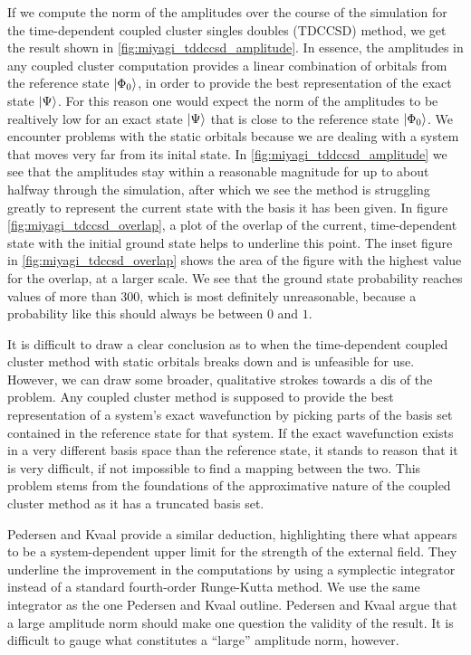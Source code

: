 If we compute the norm of the amplitudes over the course of the simulation for 
the time-dependent coupled cluster singles doubles (TDCCSD) method, we get the 
result shown in \autoref{fig:miyagi_tddccsd_amplitude}. In essence, the amplitudes 
in any coupled cluster computation provides a linear combination of orbitals 
from the reference state $\ket{\Phi_0}$, in order to provide the best representation of the 
exact state $\ket{\Psi}$. For this reason one would expect the norm of the 
amplitudes to be realtively low for an exact state $\ket{\Psi}$ that is close to the
reference state $\ket{\Phi_0}$.
We encounter problems with the static orbitals because we are dealing with a system that
moves very far 
from its inital state. In \autoref{fig:miyagi_tddccsd_amplitude} we see
that the amplitudes stay within a reasonable magnitude for up to about halfway through 
the simulation, after which we see the method is struggling greatly to 
represent the current state with the basis it has been given. In figure 
\autoref{fig:miyagi_tdccsd_overlap}, a plot of the 
overlap of the current, time-dependent state with the initial ground state
helps to underline this point. The inset figure in \autoref{fig:miyagi_tdccsd_overlap}
shows the area of the figure with the highest value for the overlap, at a larger scale.
We see that the ground state probability reaches values of more than $300$, which is 
most definitely unreasonable, because a probability like this should always be between 
$0$ and $1$.

It is difficult to draw a clear conclusion as to when the time-dependent coupled cluster 
method with static orbitals breaks down and is unfeasible for use. However, we can 
draw some broader, qualitative strokes towards a dis of the problem. Any coupled 
cluster method is supposed to provide the best representation of a system's exact 
wavefunction by picking parts of the basis set contained in the reference 
state for that system. If the exact wavefunction exists in a very different basis 
space than the reference state, it stands to reason that it is very difficult, if 
not impossible to find a mapping between the two. This problem stems from the foundations 
of the approximative nature of the coupled cluster method as it has a truncated basis set. 

Pedersen and Kvaal \cite{pedersen2019symplectic} provide a similar 
deduction, highlighting there what appears to be a system-dependent upper limit for 
the strength of the external field. They underline the improvement in the computations 
by using a symplectic integrator instead of a standard fourth-order Runge-Kutta method.
We use the same integrator as the one Pedersen and Kvaal outline.
Pedersen and Kvaal argue that a large amplitude norm should make one 
question the validity of the result. It is difficult to gauge what constitutes a ``large''
amplitude norm, however.

